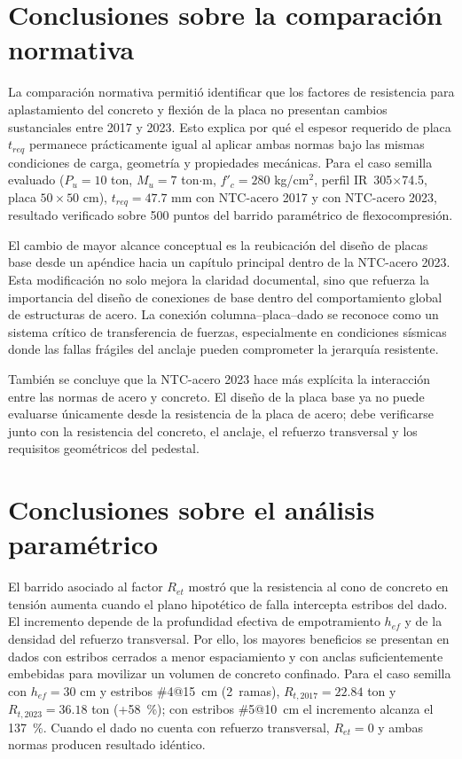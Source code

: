 \section{Conclusiones sobre la comparación normativa}

La comparación normativa permitió identificar que los factores de resistencia para aplastamiento del
concreto y flexión de la placa no presentan cambios sustanciales entre 2017 y 2023. Esto explica
por qué el espesor requerido de placa $t_{req}$ permanece prácticamente igual al aplicar ambas
normas bajo las mismas condiciones de carga, geometría y propiedades mecánicas. Para el caso semilla
evaluado ($P_u=10$ ton, $M_u=7$ ton$\cdot$m, $f'_c=280$ kg/cm$^2$, perfil IR~305$\times$74.5,
placa $50\times50$ cm), $t_{req}=47.7$ mm con NTC-acero 2017 y con NTC-acero 2023, resultado
verificado sobre 500 puntos del barrido paramétrico de flexocompresión.

El cambio de mayor alcance conceptual es la reubicación del diseño de placas base desde un apéndice
hacia un capítulo principal dentro de la NTC-acero 2023. Esta modificación no solo mejora la
claridad documental, sino que refuerza la importancia del diseño de conexiones de base dentro del
comportamiento global de estructuras de acero. La conexión columna--placa--dado se reconoce como un
sistema crítico de transferencia de fuerzas, especialmente en condiciones sísmicas donde las fallas
frágiles del anclaje pueden comprometer la jerarquía resistente.

También se concluye que la NTC-acero 2023 hace más explícita la interacción entre las normas de acero
y concreto. El diseño de la placa base ya no puede evaluarse únicamente desde la resistencia de la
placa de acero; debe verificarse junto con la resistencia del concreto, el anclaje, el refuerzo
transversal y los requisitos geométricos del pedestal.

\section{Conclusiones sobre el análisis paramétrico}

El barrido asociado al factor $R_{et}$ mostró que la resistencia al cono de concreto en tensión
aumenta cuando el plano hipotético de falla intercepta estribos del dado. El incremento depende de
la profundidad efectiva de empotramiento $h_{ef}$ y de la densidad del refuerzo transversal. Por
ello, los mayores beneficios se presentan en dados con estribos cerrados a menor espaciamiento y
con anclas suficientemente embebidas para movilizar un volumen de concreto confinado. Para el caso
semilla con $h_{ef}=30$ cm y estribos \#4@15~cm (2~ramas), $R_{t,2017}=22.84$ ton y
$R_{t,2023}=36.18$ ton (+58~\%); con estribos \#5@10~cm el incremento alcanza el 137~\%. Cuando
el dado no cuenta con refuerzo transversal, $R_{et}=0$ y ambas normas producen resultado idéntico.

